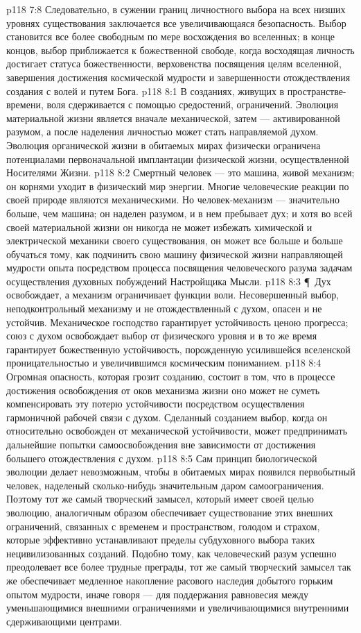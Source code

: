 \vs p118 7:8 Следовательно, в сужении границ личностного выбора на всех низших уровнях существования заключается все увеличивающаяся безопасность. Выбор становится все более свободным по мере восхождения во вселенных; в конце концов, выбор приближается к божественной свободе, когда восходящая личность достигает статуса божественности, верховенства посвящения целям вселенной, завершения достижения космической мудрости и завершенности отождествления создания с волей и путем Бога.
\vs p118 8:1 В созданиях, живущих в пространстве\hyp{}времени, воля сдерживается с помощью средостений, ограничений. Эволюция материальной жизни является вначале механической, затем --- активированной разумом, а после наделения личностью может стать направляемой духом. Эволюция органической жизни в обитаемых мирах физически ограничена потенциалами первоначальной имплантации физической жизни, осуществленной Носителями Жизни.
\vs p118 8:2 Смертный человек --- это машина, живой механизм; он корнями уходит в физический мир энергии. Многие человеческие реакции по своей природе являются механическими. Но человек\hyp{}механизм --- значительно больше, чем машина; он наделен разумом, и в нем пребывает дух; и хотя во всей своей материальной жизни он никогда не может избежать химической и электрической механики своего существования, он может все больше и больше обучаться тому, как подчинить свою машину физической жизни направляющей мудрости опыта посредством процесса посвящения человеческого разума задачам осуществления духовных побуждений Настройщика Мысли.
\vs p118 8:3 \P\ Дух освобождает, а механизм ограничивает функции воли. Несовершенный выбор, неподконтрольный механизму и не отождествленный с духом, опасен и не устойчив. Механическое господство гарантирует устойчивость ценою прогресса; союз с духом освобождает выбор от физического уровня и в то же время гарантирует божественную устойчивость, порожденную усилившейся вселенской проницательностью и увеличившимся космическим пониманием.
\vs p118 8:4 Огромная опасность, которая грозит созданию, состоит в том, что в процессе достижения освобождения от оков механизма жизни оно может не суметь компенсировать эту потерю устойчивости посредством осуществления гармоничной рабочей связи с духом. Сделанный созданием выбор, когда он относительно освобожден от механической устойчивости, может предпринимать дальнейшие попытки самоосвобождения вне зависимости от достижения большего отождествления с духом.
\vs p118 8:5 Сам принцип биологической эволюции делает невозможным, чтобы в обитаемых мирах появился первобытный человек, наделеный сколько\hyp{}нибудь значительным даром самоограничения. Поэтому тот же самый творческий замысел, который имеет своей целью эволюцию, аналогичным образом обеспечивает существование этих внешних ограничений, связанных с временем и пространством, голодом и страхом, которые эффективно устанавливают пределы субдуховного выбора таких нецивилизованных созданий. Подобно тому, как человеческий разум успешно преодолевает все более трудные преграды, тот же самый творческий замысел так же обеспечивает медленное накопление расового наследия добытого горьким опытом мудрости, иначе говоря --- для поддержания равновесия между уменьшающимися внешними ограничениями и увеличивающимися внутренними сдерживающими центрами.
